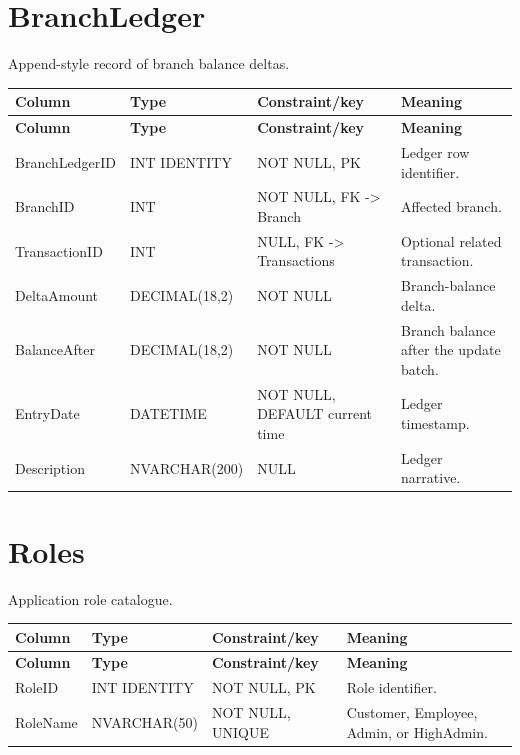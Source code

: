 \documentclass[11pt,a4paper,oneside]{report}
\begin{document}
\section{BranchLedger}
Append-style record of branch balance deltas.
\begin{longtable}{L{0.21\textwidth}L{0.18\textwidth}L{0.24\textwidth}L{0.31\textwidth}}
\toprule
\textbf{Column} & \textbf{Type} & \textbf{Constraint/key} & \textbf{Meaning}\\
\midrule\endfirsthead
\toprule\textbf{Column} & \textbf{Type} & \textbf{Constraint/key} & \textbf{Meaning}\\\midrule\endhead
BranchLedgerID & INT IDENTITY & NOT NULL, PK & Ledger row identifier.\\
BranchID & INT & NOT NULL, FK -> Branch & Affected branch.\\
TransactionID & INT & NULL, FK -> Transactions & Optional related transaction.\\
DeltaAmount & DECIMAL(18,2) & NOT NULL & Branch-balance delta.\\
BalanceAfter & DECIMAL(18,2) & NOT NULL & Branch balance after the update batch.\\
EntryDate & DATETIME & NOT NULL, DEFAULT current time & Ledger timestamp.\\
Description & NVARCHAR(200) & NULL & Ledger narrative.\\
\bottomrule
\end{longtable}

\section{Roles}
Application role catalogue.
\begin{longtable}{L{0.21\textwidth}L{0.18\textwidth}L{0.24\textwidth}L{0.31\textwidth}}
\toprule
\textbf{Column} & \textbf{Type} & \textbf{Constraint/key} & \textbf{Meaning}\\
\midrule\endfirsthead
\toprule\textbf{Column} & \textbf{Type} & \textbf{Constraint/key} & \textbf{Meaning}\\\midrule\endhead
RoleID & INT IDENTITY & NOT NULL, PK & Role identifier.\\
RoleName & NVARCHAR(50) & NOT NULL, UNIQUE & Customer, Employee, Admin, or HighAdmin.\\
\bottomrule
\end{longtable}
\end{document}
